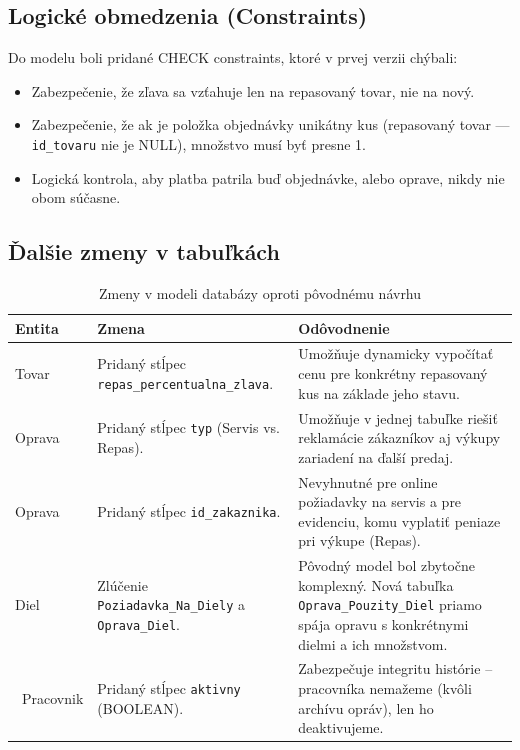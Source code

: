 \documentclass[11pt, a4paper]{article}
\begin{document}
\subsection{Logické obmedzenia (Constraints)}
Do modelu boli pridané CHECK constraints, ktoré v prvej verzii chýbali:

\begin{itemize}
    \item Zabezpečenie, že zľava sa vzťahuje len na repasovaný tovar, nie na nový.
    \item Zabezpečenie, že ak je položka objednávky unikátny kus (repasovaný tovar — \texttt{id\_tovaru} nie je NULL), množstvo musí byť presne 1.
    \item Logická kontrola, aby platba patrila buď objednávke, alebo oprave, nikdy nie obom súčasne.
\end{itemize}

\clearpage %

\subsection*{Ďalšie zmeny v tabuľkách}

\begin{table}[h]
\renewcommand{\arraystretch}{1.5} %
\centering
\begin{tabularx}{\textwidth}{|l|X|X|}
\hline
\rowcolor[gray]{0.9} %
\textbf{Entita} & \textbf{Zmena} & \textbf{Odôvodnenie} \\ \hline

Tovar & Pridaný stĺpec \texttt{repas\_percentualna\_zlava}. & Umožňuje dynamicky vypočítať cenu pre konkrétny repasovaný kus na základe jeho stavu. \\ \hline

Oprava & Pridaný stĺpec \texttt{typ} (Servis vs. Repas). & Umožňuje v jednej tabuľke riešiť reklamácie zákazníkov aj výkupy zariadení na ďalší predaj. \\ \hline

Oprava & Pridaný stĺpec \texttt{id\_zakaznika}. & Nevyhnutné pre online požiadavky na servis a pre evidenciu, komu vyplatiť peniaze pri výkupe (Repas). \\ \hline

Diel & Zlúčenie \texttt{Poziadavka\_Na\_Diely} a \texttt{Oprava\_Diel}. & Pôvodný model bol zbytočne komplexný. Nová tabuľka \texttt{Oprava\_Pouzity\_Diel} priamo spája opravu s konkrétnymi dielmi a ich množstvom. \\ \hline
\
Pracovnik & Pridaný stĺpec \texttt{aktivny} (BOOLEAN). & Zabezpečuje integritu histórie – pracovníka nemažeme (kvôli archívu opráv), len ho deaktivujeme. \\ \hline

\end{tabularx}
\caption{Zmeny v modeli databázy oproti pôvodnému návrhu}
\label{tab:zmeny_modelu}
\end{table}
\end{document}
